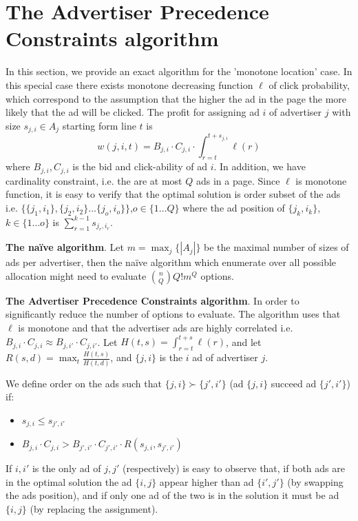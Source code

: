 
\section{The Advertiser Precedence Constraints algorithm}
\label{sec:exact}
In this section, we provide an exact algorithm for the 'monotone location' case.
In this special case there exists monotone decreasing function $\ell$ of click probability, which correspond to the assumption that the higher the ad in the page the more likely that the ad will be clicked.
The profit for assigning  ad $i$ of advertiser $j$ with size $s_{j,i} \in A_j$ starting form line $t$ is
$$w(j,i,t) = B_{j,i}\cdot C_{j,i} \cdot \int_{r=t}^{t+s_{j,i}} \ell(r)$$
where $B_{j,i}, C_{j,i}$ is the bid and click-ability of ad $i$. 
In addition, we have cardinality constraint, i.e. the are at most $Q$ ads in a page.  
Since $\ell$ is monotone function, it is easy to verify that the optimal solution is order subset of the ads i.e. $\{ \{j_1,i_1\},\{j_2,i_2\}\dots \{j_o,i_o\} \}$,$o\in \{1\dots Q\}$ where the ad position of $\{j_k,i_k\}$, $k\in \{1\dots o\}$ is $\sum_{r=1}^{k-1} s_{j_r,i_r}$. 

\textbf{The na{\"i}ve algorithm}.
Let $m = \max_j \{ |A_j| \}$ be the maximal number of sizes of ads per advertiser, then the na{\"i}ve algorithm which enumerate over all possible allocation might need to evaluate ${n \choose Q} Q! m^Q$ options.

\textbf{The Advertiser Precedence Constraints algorithm}. In order to significantly reduce the number of options to evaluate. The algorithm uses that $\ell$ is monotone and that the advertiser ads are highly correlated i.e. $B_{j,i} \cdot C_{j,i} \approx B_{j,{i'}} \cdot C_{j,i'}$.
 Let $H(t,s) = \int_{r=t}^{t+s} \ell(r)$, and let $R(s,d) = \max_t \frac{H(t,s)}{H(t,d)}$, and $\{j,i\}$ is the $i$ ad of advertiser $j$.   

We define order on the ads such that  $\{j,i\} \succ \{j',i'\}$ (ad $\{j,i\}$ succeed ad $\{j',i'\}$) if:
\begin{itemize}
	\item $s_{j,i} \leq s_{j',i'}$
	\item $B_{j,i}\cdot C_{j,i} > B_{j',i'}\cdot C_{j',i'} \cdot R(s_{j,i}, s_{j',i'})$
\end{itemize}

If $i,i'$ is the only ad of $j,j'$ (respectively) is easy to observe that, if both ads are in the optimal solution the ad $\{i,j\}$ appear higher than ad $\{i',j'\}$ (by swapping the ads position), and if only one ad of the two is in the solution it must be ad $\{i,j\}$ (by replacing the assignment).

